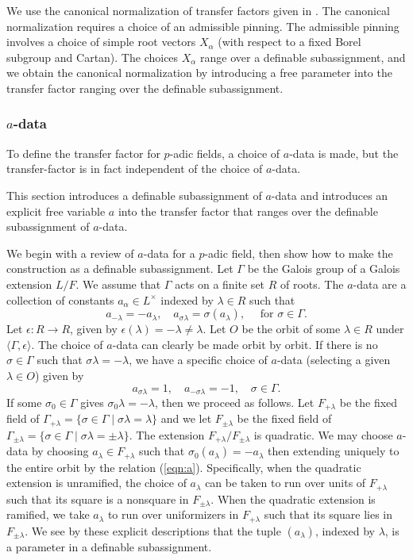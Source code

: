 We use the canonical normalization of transfer factors given in
\cite[\S7]{hales1993simple}.  The canonical normalization requires a
choice of an admissible pinning.  The admissible pinning involves a
choice of simple root vectors $X_\alpha$ (with respect to a fixed
Borel subgroup and Cartan).  The choices $X_\alpha$ range over a
definable subassignment, and we obtain the canonical normalization by
introducing a free parameter into the transfer factor ranging over the
definable subassignment.

\subsubsection{$a$-data}

To define the transfer factor for $p$-adic fields, a choice of
$a$-data is made, but the transfer-factor is in fact independent of
the choice of $a$-data.

This section introduces a definable subassignment of $a$-data and
introduces an explicit free variable $a$ into the transfer factor that
ranges over the definable subassignment of $a$-data.  

We begin with a review of $a$-data for a $p$-adic field, then show how
to make the construction as a definable subassignment.  Let $\Gamma$
be the Galois group of a Galois extension $L/F$.  We assume that
$\Gamma$ acts on a finite set $R$ of roots.  The $a$-data are a
collection of constants $a_\alpha\in L^\times$ indexed by $\lambda\in
R$ such that
\begin{equation}\label{eqn:a}
a_{-\lambda} = -a_\lambda,\quad a_{\sigma\lambda} 
= \sigma(a_\lambda),\quad \text{ for } \sigma\in \Gamma.
\end{equation}
Let $\epsilon:R\to R$, given by
$\epsilon(\lambda)=-\lambda\ne\lambda$.  Let $O$ be the orbit of some
$\lambda\in R$ under $\langle\Gamma,\epsilon\rangle$.  The choice of
$a$-data can clearly be made orbit by orbit.  If there is no
$\sigma\in \Gamma$ such that $\sigma\lambda=-\lambda$, we have a
specific choice of $a$-data (selecting a given $\lambda\in O$) given
by
\[
a_{\sigma\lambda}=1,
\quad a_{-\sigma\lambda}=-1,\quad \sigma\in\Gamma.
\]
If some $\sigma_0\in\Gamma$ gives $\sigma_0\lambda=-\lambda$, then we
proceed as follows. Let $F_{+\lambda}$ be the fixed field of
$\Gamma_{+\lambda} = \{\sigma\in\Gamma\mid \sigma\lambda=\lambda\}$
and we let $F_{\pm\lambda}$ be the fixed field of $\Gamma_{\pm\lambda}
= \{\sigma\in\Gamma\mid \sigma\lambda=\pm\lambda\}$.  The extension
$F_{+\lambda}/F_{\pm\lambda}$ is quadratic.  We may choose $a$-data by
choosing $a_\lambda\in F_{+\lambda}$ such that $\sigma_0(a_\lambda) =
-a_\lambda$ then extending uniquely to the entire orbit by the
relation (\ref{eqn:a}).  Specifically, when the quadratic extension is
unramified, the choice of $a_\lambda$ can be taken to run over units
of $F_{+\lambda}$ such that its square is a nonsquare in
$F_{\pm\lambda}$.  When the quadratic extension is ramified, we take
$a_\lambda$ to run over uniformizers in $F_{+\lambda}$ such that its
square lies in $F_{\pm\lambda}$.  We see by these explicit
descriptions that the tuple $(a_\lambda)$, indexed by $\lambda$, is a
parameter in a definable subassignment.

